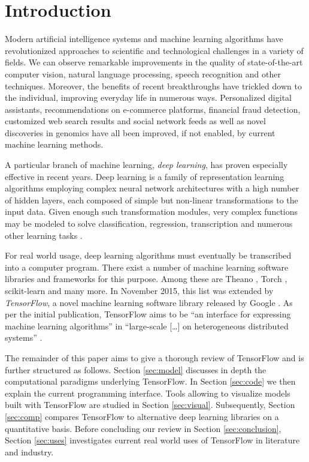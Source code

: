 \section{Introduction}

Modern artificial intelligence systems and machine learning algorithms have
revolutionized approaches to scientific and technological challenges in a
variety of fields. We can observe remarkable improvements in the quality of
state-of-the-art computer vision, natural language processing, speech
recognition and other techniques. Moreover, the benefits of recent breakthroughs
have trickled down to the individual, improving everyday life in numerous
ways. Personalized digital assistants, recommendations on e-commerce platforms,
financial fraud detection, customized web search results and social network
feeds as well as novel discoveries in genomics have all been improved, if not
enabled, by current machine learning methods.

A particular branch of machine learning, \emph{deep learning}, has proven
especially effective in recent years. Deep learning is a family of
representation learning algorithms employing complex neural network
architectures with a high number of hidden layers, each composed of simple but
non-linear transformations to the input data. Given enough such transformation
modules, very complex functions may be modeled to solve classification,
regression, transcription and numerous other learning tasks \cite{nature2015}.

For real world usage, deep learning algorithms must eventually be transcribed
into a computer program. There exist a number of machine learning software
libraries and frameworks for this purpose. Among these are Theano \cite{theano},
Torch \cite{torch}, scikit-learn \cite{scikit} and many more. In November 2015,
this list was extended by \emph{TensorFlow}, a novel machine learning software
library released by Google \cite{tensorflow}. As per the initial publication,
TensorFlow aims to be ``an interface for expressing machine learning
algorithms'' in ``large-scale [\dots] on heterogeneous distributed systems''
\cite{tensorflow}.

The remainder of this paper aims to give a thorough review of TensorFlow and is
further structured as follows. Section \ref{sec:model} discusses in depth the
computational paradigms underlying TensorFlow. In Section \ref{sec:code} we then
explain the current programming interface. Tools allowing to visualize models
built with TensorFlow are studied in Section \ref{sec:visual}. Subsequently,
Section \ref{sec:comp} compares TensorFlow to alternative deep learning
libraries on a quantitative basis. Before concluding our review in Section
\ref{sec:conclusion}, Section \ref{sec:uses} investigates current real world
uses of TensorFlow in literature and industry.

